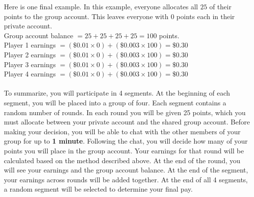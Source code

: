 \documentclass[11pt]{article}
\begin{document}
    \noindent Here is one final example. In this example, everyone allocates all $25$ of their points to the group account. This leaves everyone with 0 points each in their private account.\\
    \noindent Group account balance $= 25+25+25+25=100$ points.\\
    Player 1 earnings $= (\$0.01\times0)+(\$0.003\times100) = \$0.30$\\
    Player 2 earnings $= (\$0.01\times0)+(\$0.003\times100) = \$0.30$\\
    Player 3 earnings $= (\$0.01\times0)+(\$0.003\times100) = \$0.30$\\
    Player 4 earnings $= (\$0.01\times0)+(\$0.003\times100) = \$0.30$\\\\

    \noindent To summarize, you will participate in 4 segments. At the beginning of each segment, you will be placed into a group of four. Each segment contains a random number of rounds. In each round you will be given 25 points, which you must allocate between your private account and the shared group account. Before making your decision, you will be able to chat with the other members of your group for up to \textbf{1 minute}. Following the chat, you will decide how many of your points you will place in the group account. Your earnings for that round will be calculated based on the method described above. At the end of the round, you will see your earnings and the group account balance. At the end of the segment, your earnings across rounds will be added together. At the end of all 4 segments, a random segment will be selected to determine your final pay.  







\newpage




\end{document}
